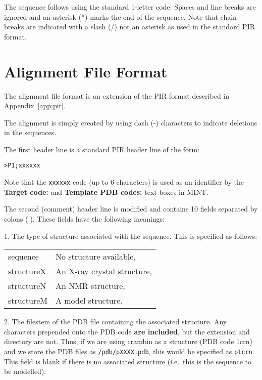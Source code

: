 \documentclass[12pt]{article}
\begin{document}
The sequence follows using the standard 1-letter code. Spaces and line
breaks are ignored and an asterisk (*) marks the end of the
sequence. Note that chain breaks are indicated with a slash (/) not an
asterisk as used in the standard PIR format.









\section{Alignment File Format}
\label{app:align}
The alignment file format is an extension of the PIR format described
in Appendix~\ref{app:pir}.

The alignment is simply created by using dash (-) characters to
indicate deletions in the sequences. 

The first header line is a standard PIR header line of the form:
\begin{verbatim}
>P1;xxxxxx
\end{verbatim}
Note that the {\tt xxxxxx} code (up to 6 characters) is used as an
identifier by the {\bfseries Target code:} and {\bfseries Template PDB
codes:} text boxes in MINT.

The second (comment) header line is modified and contains 10 fields
separated by colons (:). These fields have the following meanings:

1. The type of structure associated with the sequence. This is
specified as follows:
\begin{center}
\begin{tabular}{ll}
   sequence    & No structure available,        \\
   structureX  & An X-ray crystal structure,    \\
   structureN  & An NMR structure,              \\
   structureM  & A model structure.             \\
\end{tabular}
\end{center}

2. The filestem of the PDB file containing the associated
structure. Any characters prepended onto the PDB code {\bfseries are included},
but the extension and directory are not. Thus, if we are using crambin
as a structure (PDB code 1crn) and we store the PDB files as
{\tt /pdb/pXXXX.pdb}, this would be specified as {\tt p1crn}. This field is
blank if there is no associated structure (i.e.\ this is the sequence
to be modelled).
\end{document}
